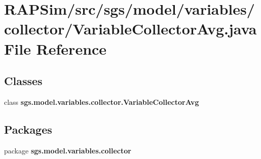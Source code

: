 \section{R\-A\-P\-Sim/src/sgs/model/variables/collector/\-Variable\-Collector\-Avg.java File Reference}
\label{_variable_collector_avg_8java}
\subsection*{Classes}
\begin{DoxyCompactItemize}
\item 
class {\bf sgs.\-model.\-variables.\-collector.\-Variable\-Collector\-Avg}
\end{DoxyCompactItemize}
\subsection*{Packages}
\begin{DoxyCompactItemize}
\item 
package {\bf sgs.\-model.\-variables.\-collector}
\end{DoxyCompactItemize}

